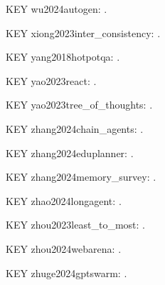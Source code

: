\documentclass[a4paper,fleqn]{cas-dc}
\begin{document}
\noindent KEY wu2024autogen: \citep{wu2024autogen}.\par
\noindent KEY xiong2023inter\_consistency: \citep{xiong2023inter_consistency}.\par
\noindent KEY yang2018hotpotqa: \citep{yang2018hotpotqa}.\par
\noindent KEY yao2023react: \citep{yao2023react}.\par
\noindent KEY yao2023tree\_of\_thoughts: \citep{yao2023tree_of_thoughts}.\par
\noindent KEY zhang2024chain\_agents: \citep{zhang2024chain_agents}.\par
\noindent KEY zhang2024eduplanner: \citep{zhang2024eduplanner}.\par
\noindent KEY zhang2024memory\_survey: \citep{zhang2024memory_survey}.\par
\noindent KEY zhao2024longagent: \citep{zhao2024longagent}.\par
\noindent KEY zhou2023least\_to\_most: \citep{zhou2023least_to_most}.\par
\noindent KEY zhou2024webarena: \citep{zhou2024webarena}.\par
\noindent KEY zhuge2024gptswarm: \citep{zhuge2024gptswarm}.\par

\nocite{*}
\printbibliography
\end{document}
